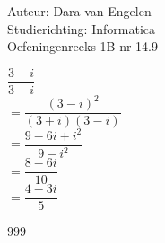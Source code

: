 \documentclass[a4paper]{article}
\begin{document}
  
\noindent \large Auteur: Dara van Engelen \\
\noindent \large Studierichting: Informatica\\
\noindent \large Oefeningenreeks 1B nr 14.9
\\

\medskip

\normalsize

$\dfrac{3-i}{3+i}$ \\

$ = \dfrac{(3-i)^2}{(3+i)(3-i)}$\\

$ = \dfrac{9-6i+i^2}{9-i^2}$\\

$ = \dfrac{8-6i}{10}$\\

$ = \dfrac{4-3i}{5}$\\


\begin{thebibliography}{999}
\end{thebibliography}
\end{document}
